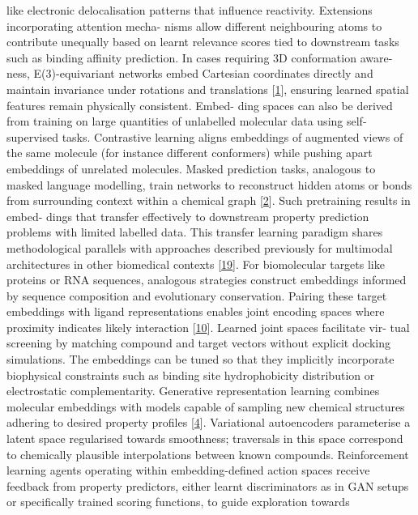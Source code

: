 \documentclass[
]{article}
\begin{document}
like electronic delocalisation patterns that influence reactivity.
Extensions incorporating attention mecha- nisms allow different
neighbouring atoms to contribute unequally based on learnt relevance
scores tied to downstream tasks such as binding affinity prediction. In
cases requiring 3D conformation aware- ness, E(3)-equivariant networks
embed Cartesian coordinates directly and maintain invariance under
rotations and translations {[}\hyperref[_bookmark41]{1}{]}, ensuring
learned spatial features remain physically consistent. Embed- ding
spaces can also be derived from training on large quantities of
unlabelled molecular data using self-supervised tasks. Contrastive
learning aligns embeddings of augmented views of the same molecule (for
instance different conformers) while pushing apart embeddings of
unrelated molecules. Masked prediction tasks, analogous to masked
language modelling, train networks to reconstruct hidden atoms or bonds
from surrounding context within a chemical graph
{[}\hyperref[_bookmark42]{2}{]}. Such pretraining results in embed-
dings that transfer effectively to downstream property prediction
problems with limited labelled data. This transfer learning paradigm
shares methodological parallels with approaches described previously for
multimodal architectures in other biomedical contexts
{[}\hyperref[_bookmark59]{19}{]}. For biomolecular targets like proteins
or RNA sequences, analogous strategies construct embeddings informed by
sequence composition and evolutionary conservation. Pairing these target
embeddings with ligand representations enables joint encoding spaces
where proximity indicates likely interaction
{[}\hyperref[_bookmark50]{10}{]}. Learned joint spaces facilitate vir-
tual screening by matching compound and target vectors without explicit
docking simulations. The embeddings can be tuned so that they implicitly
incorporate biophysical constraints such as binding site hydrophobicity
distribution or electrostatic complementarity. Generative representation
learning combines molecular embeddings with models capable of sampling
new chemical structures adhering to desired property profiles
{[}\hyperref[_bookmark44]{4}{]}. Variational autoencoders parameterise a
latent space regularised towards smoothness; traversals in this space
correspond to chemically plausible interpolations between known
compounds. Reinforcement learning agents operating within
embedding-defined action spaces receive feedback from property
predictors, either learnt discriminators as in GAN setups or
specifically trained scoring functions, to guide exploration towards
\end{document}
